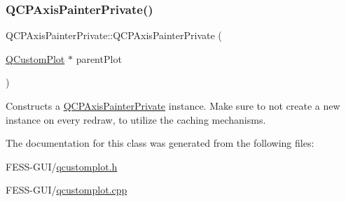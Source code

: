 \subsubsection{\texorpdfstring{Q\+C\+P\+Axis\+Painter\+Private()}{QCPAxisPainterPrivate()}}
{\footnotesize\ttfamily Q\+C\+P\+Axis\+Painter\+Private\+::\+Q\+C\+P\+Axis\+Painter\+Private (\begin{DoxyParamCaption}\item[{\hyperlink{class_q_custom_plot}{Q\+Custom\+Plot} $\ast$}]{parent\+Plot }\end{DoxyParamCaption})\hspace{0.3cm}{\ttfamily [explicit]}}

Constructs a \hyperlink{class_q_c_p_axis_painter_private}{Q\+C\+P\+Axis\+Painter\+Private} instance. Make sure to not create a new instance on every redraw, to utilize the caching mechanisms. 

The documentation for this class was generated from the following files\+:\begin{DoxyCompactItemize}
\item 
F\+E\+S\+S-\/\+G\+U\+I/\hyperlink{qcustomplot_8h}{qcustomplot.\+h}\item 
F\+E\+S\+S-\/\+G\+U\+I/\hyperlink{qcustomplot_8cpp}{qcustomplot.\+cpp}\end{DoxyCompactItemize}
